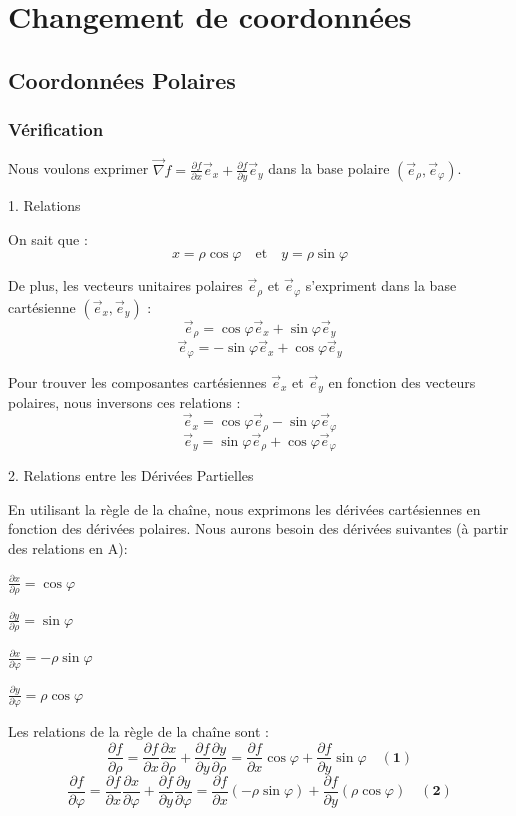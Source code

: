 \documentclass[french]{yLectureNote}
\renewcommand{\vec}{\overrightarrow}
\begin{document}
\section{Changement de coordonnées}
\subsection{Coordonnées Polaires}
\subsubsection{Vérification}
Nous voulons exprimer $\vec{\nabla}f = \frac{\partial f}{\partial x}\vec{e}_{x} + \frac{\partial f}{\partial y}\vec{e}_{y}$ dans la base polaire $(\vec{e}_{\rho}, \vec{e}_{\varphi})$.

1. Relations

On sait que :
$$
x = \rho \cos \varphi \quad \text{et} \quad y = \rho \sin \varphi
$$

De plus, les vecteurs unitaires polaires $\vec{e}_{\rho}$ et $\vec{e}_{\varphi}$ s'expriment dans la base cartésienne $(\vec{e}_{x}, \vec{e}_{y})$ :
$$
\vec{e}_{\rho} = \cos \varphi \vec{e}_{x} + \sin \varphi \vec{e}_{y}
$$
$$
\vec{e}_{\varphi} = -\sin \varphi \vec{e}_{x} + \cos \varphi \vec{e}_{y}
$$

Pour trouver les composantes cartésiennes $\vec{e}_{x}$ et $\vec{e}_{y}$ en fonction des vecteurs polaires, nous inversons ces relations :
$$
\vec{e}_{x} = \cos \varphi \vec{e}_{\rho} - \sin \varphi \vec{e}_{\varphi}
$$
$$
\vec{e}_{y} = \sin \varphi \vec{e}_{\rho} + \cos \varphi \vec{e}_{\varphi}
$$

2. Relations entre les Dérivées Partielles

En utilisant la règle de la chaîne, nous exprimons les dérivées cartésiennes en fonction des dérivées polaires. Nous aurons besoin des dérivées suivantes (à partir des relations en A):

 $\frac{\partial x}{\partial \rho} = \cos \varphi$

 $\frac{\partial y}{\partial \rho} = \sin \varphi$

 $\frac{\partial x}{\partial \varphi} = -\rho \sin \varphi$

 $\frac{\partial y}{\partial \varphi} = \rho \cos \varphi$

Les relations de la règle de la chaîne sont :
$$
\frac{\partial f}{\partial \rho} = \frac{\partial f}{\partial x}\frac{\partial x}{\partial \rho} + \frac{\partial f}{\partial y}\frac{\partial y}{\partial \rho} = \frac{\partial f}{\partial x}\cos \varphi + \frac{\partial f}{\partial y}\sin \varphi \quad \mathbf{(1)}
$$
$$
\frac{\partial f}{\partial \varphi} = \frac{\partial f}{\partial x}\frac{\partial x}{\partial \varphi} + \frac{\partial f}{\partial y}\frac{\partial y}{\partial \varphi} = \frac{\partial f}{\partial x}(-\rho \sin \varphi) + \frac{\partial f}{\partial y}(\rho \cos \varphi) \quad \mathbf{(2)}
$$
\end{document}
